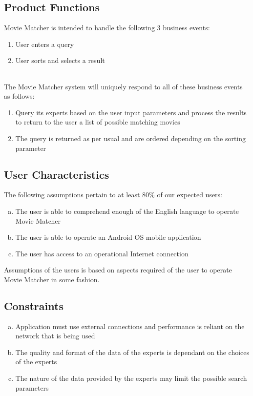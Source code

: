 \documentclass[]{article}
\begin{document}
\subsection{Product Functions}
\label{sub:product_functions}
Movie Matcher is intended to handle the following 3 business events:
\begin{enumerate}
	\item User enters a query
	\item User sorts and selects a result
\end{enumerate}
\\
The Movie Matcher system will uniquely respond to all of these business events as follows:
\begin{enumerate}
\item Query its experts based on the user input parameters and process the results to return to the user a list of possible matching movies
\item The query is returned as per usual and are ordered depending on the sorting parameter
\end{enumerate}

\subsection{User Characteristics}
\label{sub:user_characteristics}
The following assumptions pertain to at least 80\% of our expected users:
\begin{enumerate}[a)]
	\item The user is able to comprehend enough of the English language to operate Movie Matcher
	\item The user is able to operate an Android OS mobile application
	\item The user has access to an operational Internet connection
\end{enumerate}
Assumptions of the users is based on aspects required of the user to operate Movie Matcher in some fashion.

\subsection{Constraints}
\label{sub:constraints}
\begin{enumerate}[a)]
	\item Application must use external connections and performance is reliant on the network that is being used
	\item The quality and format of the data of the experts is dependant on the choices of the experts
	\item The nature of the data provided by the experts may limit the possible search parameters
\end{enumerate}
\end{document}
